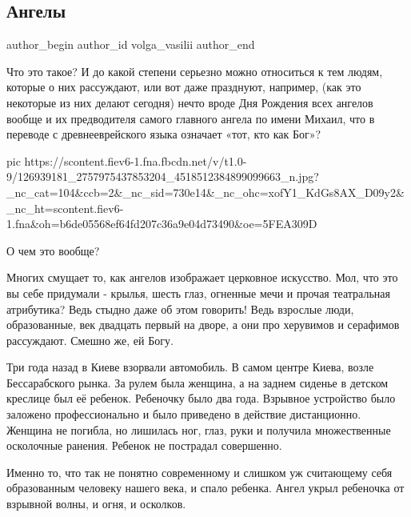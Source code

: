 
 
 
 
 
 
\subsection{Ангелы}
\label{sec:21_11_2020.fb.volga_vasilii.2.angely}
\ifcmt
	author_begin
   author_id volga_vasilii
	author_end
\fi

Что это такое? И до какой степени серьезно можно относиться к тем людям,
которые о них рассуждают, или вот даже празднуют, например, (как это некоторые
из них делают сегодня) нечто вроде Дня Рождения всех ангелов вообще и их
предводителя самого главного ангела по имени Михаил, что в переводе с
древнееврейского языка означает «тот, кто как Бог»?

\ifcmt
pic https://scontent.fiev6-1.fna.fbcdn.net/v/t1.0-9/126939181_2757975437853204_4518512384899099663_n.jpg?_nc_cat=104&ccb=2&_nc_sid=730e14&_nc_ohc=xofY1_KdGs8AX_D09y2&_nc_ht=scontent.fiev6-1.fna&oh=b6de05568ef64fd207c36a9e04d73490&oe=5FEA309D
\fi

О чем это вообще?

Многих смущает то, как ангелов изображает церковное искусство. Мол, что это вы
себе придумали - крылья, шесть глаз, огненные мечи и прочая театральная
атрибутика? Ведь стыдно даже об этом говорить! Ведь взрослые люди,
образованные, век двадцать первый на дворе, а они про херувимов и серафимов
рассуждают. Смешно же, ей Богу.

Три года назад в Киеве взорвали автомобиль. В самом центре Киева, возле
Бессарабского рынка. За рулем была женщина, а на заднем сиденье в детском
креслице был её ребенок. Ребеночку было два года. Взрывное устройство было
заложено профессионально и было приведено в действие дистанционно. Женщина не
погибла, но лишилась ног, глаз, руки и получила множественные осколочные
ранения. Ребенок не пострадал совершенно.

Именно то, что так не понятно современному и слишком уж считающему себя
образованным человеку нашего века, и спало ребенка. Ангел укрыл ребеночка от
взрывной волны, и огня, и осколков.

